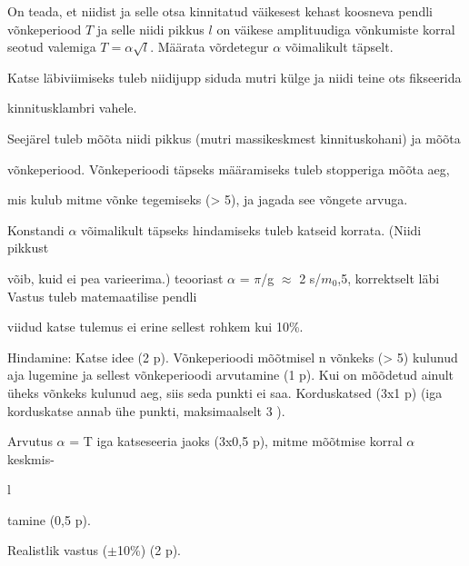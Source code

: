 
On teada, et niidist ja selle otsa kinnitatud väikesest kehast koosneva pendli
võnkeperiood $T$ ja selle niidi pikkus $l$ on väikese amplituudiga võnkumiste
korral seotud valemiga $T = \alpha\sqrt{l}$. Määrata võrdetegur $\alpha$
võimalikult täpselt.

\hint

\solu
Katse läbiviimiseks tuleb niidijupp siduda mutri külge ja niidi teine ots fikseerida

kinnitusklambri vahele.

Seejärel tuleb mõõta niidi pikkus (mutri massikeskmest kinnituskohani) ja mõõta

võnkeperiood. Võnkeperioodi täpseks määramiseks tuleb stopperiga mõõta aeg,

mis kulub mitme võnke tegemiseks (> 5), ja jagada see võngete arvuga.

Konstandi $\alpha$ võimalikult täpseks hindamiseks tuleb katseid korrata. (Niidi pikkust

võib, kuid ei pea varieerima.) teooriast $\alpha$ = $\pi$/g $\approx$ 2 s/$m_0$,5, korrektselt läbi Vastus tuleb matemaatilise pendli

viidud katse tulemus ei erine sellest rohkem kui 10\%.

Hindamine: Katse idee (2 p). Võnkeperioodi mõõtmisel n võnkeks (> 5) kulunud aja lugemine ja sellest võnkeperioodi arvutamine (1 p). Kui on mõõdetud ainult üheks võnkeks kulunud aeg, siis seda punkti ei saa. Korduskatsed (3x1 p) (iga korduskatse annab ühe punkti, maksimaalselt 3 ).

Arvutus $\alpha$ = T iga katseseeria jaoks (3x0,5 p), mitme mõõtmise korral $\alpha$ keskmis-

l

tamine (0,5 p).

Realistlik vastus ($\pm$10\%) (2 p).
\probend
